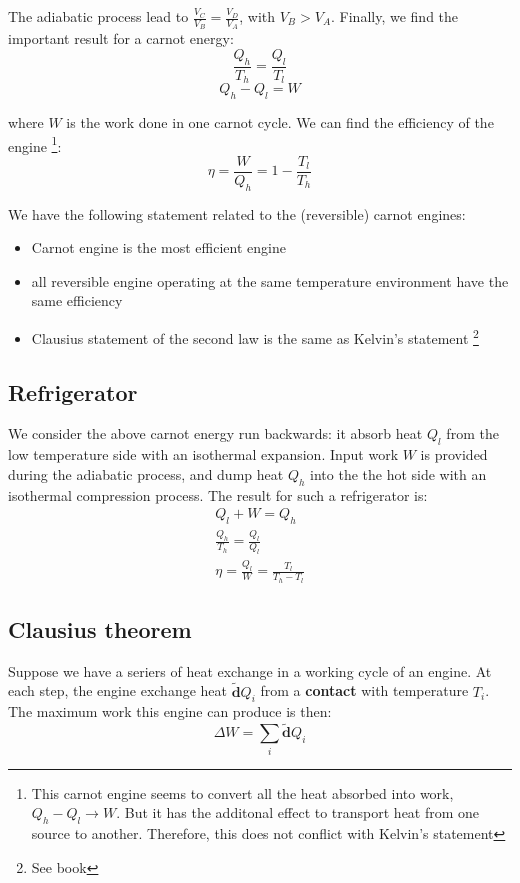 \documentclass{article}
\newcommand{\dbar}{\mathbf{\tilde{d}}}
\begin{document}
The adiabatic process lead to $\frac{V_C}{V_B} = \frac{V_D}{V_A} $, with $V_B > V_A$. Finally, we 
find the important result for a carnot energy:
\[\boxed{\frac{Q_h}{T_h} = \frac{Q_l}{T_l} }\]
\begin{equation}
    Q_h - Q_l = W 
\end{equation}

where $W$ is the work done in one carnot cycle. We can find the efficiency of the engine
\footnote{This carnot engine seems to convert all the heat absorbed into work, $Q_h - Q_l \to W$. But
it has the additonal effect to transport heat from one source to another. Therefore, this does not 
conflict with Kelvin's statement}:
\begin{equation}
    \eta = \frac{W}{Q_h} = 1 - \frac{T_l}{T_h}
\end{equation}

We have the following statement related to the (reversible) carnot engines:
\begin{itemize}
    \item Carnot engine is the most efficient engine
    \item all reversible engine operating at the same temperature environment have the same efficiency
    \item Clausius statement of the second law is the same as Kelvin's statement \footnote{See book}
\end{itemize}

\subsection{Refrigerator}
We consider the above carnot energy run backwards: it absorb heat $Q_l$ from the 
low temperature side with an isothermal expansion. Input work $W$ is provided 
during the adiabatic process, and dump heat $Q_h$ into the the hot side 
with an isothermal compression process. The result for such a refrigerator is:
\begin{gather}
    Q_l + W = Q_h \\
    \frac{Q_h}{T_h} = \frac{Q_l}{Q_l} \\
    \eta = \frac{Q_l}{W} = \frac{T_l}{T_h - T_l}
\end{gather} 

\subsection{Clausius theorem}
Suppose we have a seriers of heat exchange in a working cycle of an engine. At 
each step, the engine exchange heat $\dbar Q_i $ from a \textbf{contact} with 
temperature $T_i$. The maximum work this engine can produce is then:
\begin{equation}
    \Delta W = \sum_i \dbar Q_i
\end{equation}
\end{document}
